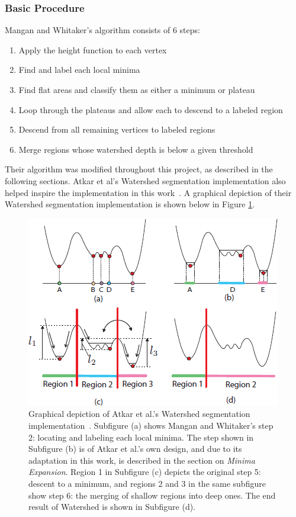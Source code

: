 \subsubsection{Basic Procedure}
Mangan and Whitaker's algorithm consists of 6 steps:
\begin{enumerate}
	\item Apply the height function to each vertex
	\item Find and label each local minima
	\item Find flat areas and classify them as either a minimum or plateau
	\item \label{plateau_step} Loop through the plateaus and allow each to descend to a labeled region
	\item Descend from all remaining vertices to labeled regions
	\item Merge regions whose watershed depth is below a given threshold
\end{enumerate}

Their algorithm was modified throughout this project, as described in the following sections.
Atkar et al's Watershed segmentation implementation also helped inspire the implementation in this work~\cite{HierSurfSeg_for_autobody_painting}.
A graphical depiction of their Watershed segmentation implementation is shown below in Figure \ref{fig:ws_1570179_steps}.
\begin{figure}[htb]
	\centering
	\includegraphics[width=0.5\linewidth]{../resources/watershed/1570179_WS_steps.png}
\caption{
Graphical depiction of Atkar et al.'s Watershed segmentation implementation~\cite{HierSurfSeg_for_autobody_painting}.
Subfigure (a) shows Mangan and Whitaker's step 2: locating and labeling each local minima.
The step shown in Subfigure (b) is of Atkar et al.'s own design, and due to its adaptation in this work, is described in the section on \textit{Minima Expansion}.
Region 1 in Subfigure (c) depicts the original step 5: descent to a minimum, and regions 2 and 3 in the same subfigure show step 6: the merging of shallow regions into deep ones.
The end result of Watershed is shown in Subfigure (d).
}
	\label{fig:ws_1570179_steps}
\end{figure}

